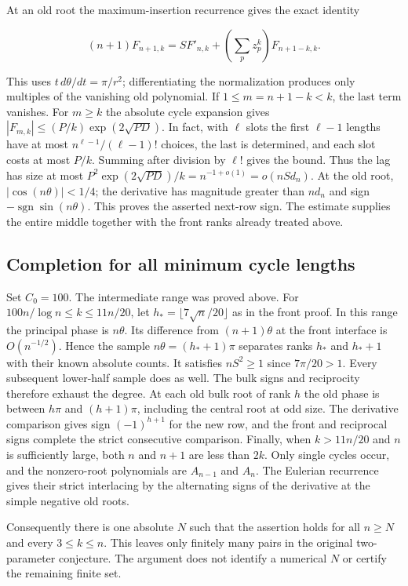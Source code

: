 \documentclass[11pt]{article}
\begin{document}
At an old root the maximum-insertion recurrence gives the exact identity

\[
 (n+1)F_{n+1,k}=S F'_{n,k}+\left(\sum_p z_p^k\right)F_{n+1-k,k}.
\]

This uses $t\,d\theta/dt=\pi/r^2$; differentiating the normalization produces only multiples of the vanishing old polynomial. If $1\le m=n+1-k<k$, the last term vanishes. For $m\ge k$ the absolute cycle expansion gives $|F_{m,k}|\le (P/k)\exp(2\sqrt{PD})$. In fact, with $\ell$ slots the first $\ell-1$ lengths have at most $n^{\ell-1}/(\ell-1)!$ choices, the last is determined, and each slot costs at most $P/k$. Summing after division by $\ell!$ gives the bound. Thus the lag has size at most $P^2\exp(2\sqrt{PD})/k=n^{-1+o(1)}=o(n S d_n)$. At the old root, $|\cos(n\theta)|<1/4$; the derivative has magnitude greater than $n d_n$ and sign $-\operatorname{sgn}\sin(n\theta)$. This proves the asserted next-row sign. The estimate supplies the entire middle together with the front ranks already treated above.


\subsection{Completion for all minimum cycle lengths}

Set $C_0=100$. The intermediate range was proved above. For $100n/\log n\le k\le11n/20$, let $h_*=\lfloor7\sqrt n/20\rfloor$ as in the front proof. In this range the principal phase is $n\theta$. Its difference from $(n+1)\theta$ at the front interface is $O(n^{-1/2})$. Hence the sample $n\theta=(h_*+1)\pi$ separates ranks $h_*$ and $h_*+1$ with their known absolute counts. It satisfies $nS^2\ge1$ since $7\pi/20>1$. Every subsequent lower-half sample does as well. The bulk signs and reciprocity therefore exhaust the degree. At each old bulk root of rank $h$ the old phase is between $h\pi$ and $(h+1)\pi$, including the central root at odd size. The derivative comparison gives sign $(-1)^{h+1}$ for the new row, and the front and reciprocal signs complete the strict consecutive comparison. Finally, when $k>11n/20$ and $n$ is sufficiently large, both $n$ and $n+1$ are less than $2k$. Only single cycles occur, and the nonzero-root polynomials are $A_{n-1}$ and $A_n$. The Eulerian recurrence gives their strict interlacing by the alternating signs of the derivative at the simple negative old roots.

Consequently there is one absolute $N$ such that the assertion holds for all $n\ge N$ and every $3\le k\le n$. This leaves only finitely many pairs in the original two-parameter conjecture. The argument does not identify a numerical $N$ or certify the remaining finite set.
\end{document}
